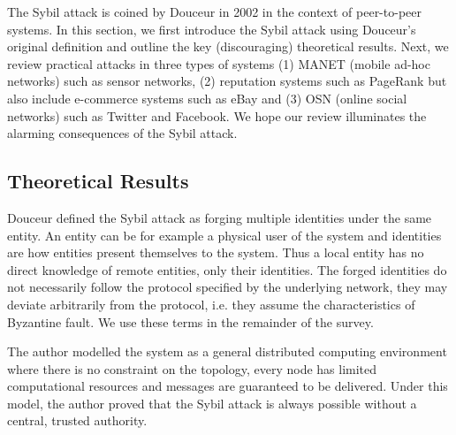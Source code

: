 The Sybil attack is coined by Douceur\cite{douceur2002sybil} in 2002 in the
context of peer-to-peer systems. In this section, we first introduce the Sybil
attack using Douceur's original definition and outline the key (discouraging)
theoretical results. Next, we review practical attacks in three types of systems
(1) MANET (mobile ad-hoc networks) such as sensor networks, (2) reputation
systems such as PageRank\cite{page1999pagerank} but also include e-commerce
systems such as eBay and (3) OSN (online social networks) such as Twitter and
Facebook. We hope our review illuminates the alarming consequences of the Sybil
attack.

\subsection{Theoretical Results}
Douceur defined the Sybil attack as forging multiple identities under the same
entity\cite{douceur2002sybil}. An entity can be for example a physical user of
the system and identities are how entities present themselves to the system.
Thus a local entity has no direct knowledge of remote entities, only their
identities. The forged identities do not necessarily follow the protocol
specified by the underlying network, they may deviate arbitrarily from the
protocol, i.e. they assume the characteristics of Byzantine
fault\cite{lamport1982byzantine}. We use these terms in the remainder of the
survey.

The author modelled the system as a general distributed computing
environment where there is no constraint on the topology, every node has limited
computational resources and messages are guaranteed to be delivered. Under this
model, the author proved that the Sybil attack is always possible without a
central, trusted authority.



